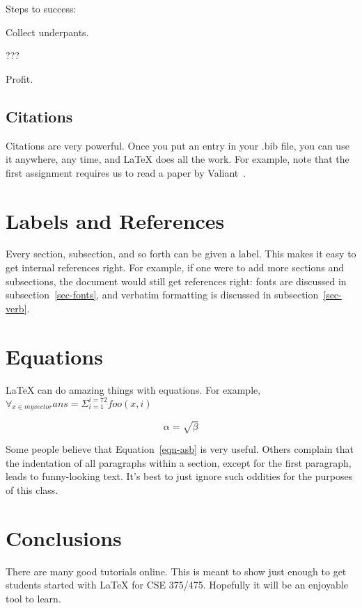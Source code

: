 \documentclass[10pt, letterpaper]{article}
\begin{document}
Steps to success:
\begin{compactenum}
\item Collect underpants.
\item ???
\item Profit.
\end{compactenum}

\subsection{Citations}
Citations are very powerful.  Once you put an entry in your .bib file, you
can use it anywhere, any time, and LaTeX does all the work.  For example,
note that the first assignment requires us to read a paper by
Valiant~\cite{valiant-cacm-1990}.

\section{Labels and References}
\label{sec-labels}
Every section, subsection, and so forth can be given a label.  This makes it
easy to get internal references right.  For example, if one were to add more
sections and subsections, the document would still get references right:
fonts are discussed in subsection~\ref{sec-fonts}, and verbatim formatting is
discussed in subsection~\ref{sec-verb}.

\section{Equations}
LaTeX can do amazing things with equations.  For example, $\forall_{x \in
  myvector} {ans = \Sigma_{i=1}^{i=72}foo(x,i)}$

\begin{equation}
\label{eqn-asb}
\alpha = \sqrt{ \beta }
\end{equation}

Some people believe that Equation~\ref{eqn-asb} is very useful.  Others
complain that the indentation of all paragraphs within a section, except for
the first paragraph, leads to funny-looking text.  It's best to just ignore
such oddities for the purposes of this class.

%
%


\section{Conclusions}
There are many good tutorials online.  This is meant to show just enough to
get students started with LaTeX for CSE 375/475.  Hopefully it will be an
enjoyable tool to learn.



\end{document}
